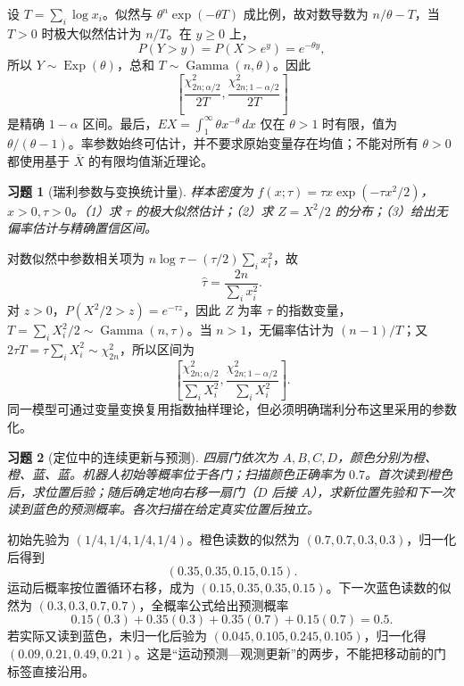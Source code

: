 \documentclass[12pt,fontset=fandol]{ctexart}
\newtheorem{exercise}{习题}[section]
\begin{document}
\begin{solve}\label{a:M-F-5}设 $T=\sum_i\log x_i$。似然与 $\theta^n\exp(-\theta T)$ 成比例，故对数导数为 $n/\theta-T$，当 $T>0$ 时极大似然估计为 $n/T$。在 $y\ge0$ 上，\[P(Y>y)=P(X>e^y)=e^{-\theta y},\]所以 $Y\sim\operatorname{Exp}(\theta)$，总和 $T\sim\operatorname{Gamma}(n,\theta)$。因此\[\left[\frac{\chi^2_{2n;\alpha/2}}{2T},\frac{\chi^2_{2n;1-\alpha/2}}{2T}\right]\]是精确 $1-\alpha$ 区间。最后，$EX=\int_1^\infty\theta x^{-\theta}\,dx$ 仅在 $\theta>1$ 时有限，值为 $\theta/(\theta-1)$。率参数始终可估计，并不要求原始变量存在均值；不能对所有 $\theta>0$ 都使用基于 $\overline X$ 的有限均值渐近理论。\end{solve}

\begin{exercise}[瑞利参数与变换统计量]\label{q:M-PF-26}
样本密度为 $f(x;\tau)=\tau x\exp(-\tau x^2/2)$，$x>0,\tau>0$。（1）求 $\tau$ 的极大似然估计；（2）求 $Z=X^2/2$ 的分布；（3）给出无偏率估计与精确置信区间。\par{}
\end{exercise}

\begin{solve}\label{a:M-PF-26}对数似然中参数相关项为 $n\log\tau-(\tau/2)\sum_i x_i^2$，故\[\widehat\tau=\frac{2n}{\sum_i x_i^2}.\]对 $z>0$，$P(X^2/2>z)=e^{-\tau z}$，因此 $Z$ 为率 $\tau$ 的指数变量，$T=\sum_iX_i^2/2\sim\operatorname{Gamma}(n,\tau)$。当 $n>1$，无偏率估计为 $(n-1)/T$；又 $2\tau T=\tau\sum_iX_i^2\sim\chi^2_{2n}$，所以区间为\[\left[\frac{\chi^2_{2n;\alpha/2}}{\sum_iX_i^2},\frac{\chi^2_{2n;1-\alpha/2}}{\sum_iX_i^2}\right].\]同一模型可通过变量变换复用指数抽样理论，但必须明确瑞利分布这里采用的参数化。\end{solve}

\begin{exercise}[定位中的连续更新与预测]\label{q:M-F-7}
四扇门依次为 $A,B,C,D$，颜色分别为橙、橙、蓝、蓝。机器人初始等概率位于各门；扫描颜色正确率为 $0.7$。首次读到橙色后，求位置后验；随后确定地向右移一扇门（$D$ 后接 $A$），求新位置先验和下一次读到蓝色的预测概率。各次扫描在给定真实位置后独立。\par{}
\end{exercise}

\begin{solve}\label{a:M-F-7}初始先验为 $(1/4,1/4,1/4,1/4)$。橙色读数的似然为 $(0.7,0.7,0.3,0.3)$，归一化后得到\[(0.35,0.35,0.15,0.15).\]运动后概率按位置循环右移，成为 $(0.15,0.35,0.35,0.15)$。下一次蓝色读数的似然为 $(0.3,0.3,0.7,0.7)$，全概率公式给出预测概率\[0.15(0.3)+0.35(0.3)+0.35(0.7)+0.15(0.7)=0.5.\]若实际又读到蓝色，未归一化后验为 $(0.045,0.105,0.245,0.105)$，归一化得 $(0.09,0.21,0.49,0.21)$。这是“运动预测—观测更新”的两步，不能把移动前的门标签直接沿用。\end{solve}
\end{document}

